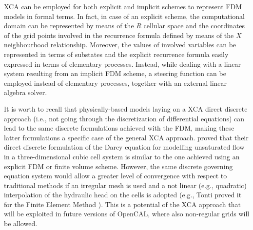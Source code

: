         

    XCA can be employed for both explicit and implicit schemes to
    represent FDM models in formal terms. In fact, in case of an
    explicit scheme, the computational domain can be represented by
    means of the $R$ cellular space and the coordinates of the grid
    points involved in the recurrence formula defined by means of the
    $X$ neighbourhood relationship. Moreover, the values of involved
    variables can be represented in terms of substates and the
    explicit recurrence formula easily expressed in terms of
    elementary processes. Instead, while dealing with a linear system
    resulting from an implicit FDM scheme, a steering function can be
    employed instead of elementary processes, together with an
    external linear algebra solver.

    It is worth to recall that physically-based models laying on a XCA
    direct discrete approach (i.e., not going through the
    discretization of differential equations) can lead to the same
    discrete formulations achieved with the FDM, making these latter
    formulations a specific case of the general XCA
    approach. \cite{Mendicino:2006} proved that
    their direct discrete formulation of the Darcy equation for
    modelling unsaturated flow in a three-dimensional cubic cell
    system is similar to the one achieved using an explicit FDM or
    finite volume scheme. However, the same discrete governing
    equation system would allow a greater level of convergence with
    respect to traditional methods if an irregular mesh is used
    and a not linear (e.g., quadratic) interpolation of the hydraulic
    head on the cells is adopted (e.g., Tonti proved it for the Finite
    Element Method \cite{Tonti2001237}). This is a potential of the XCA
    approach that will be exploited in future versions of OpenCAL,
    where also non-regular grids will be allowed.







